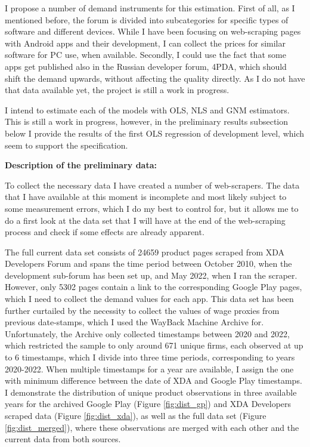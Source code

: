 \documentclass[13pt]{article}
\numberwithin{figure}{section}
\numberwithin{table}{section}
\theoremstyle{indented}
\numberwithin{equation}{section} %
\begin{document}
I propose a number of demand instruments for this estimation. First of all, as I mentioned before, the forum is divided into subcategories for specific types of software and different devices. While I have been focusing on web-scraping pages with Android apps and their development, I can collect the prices for similar software for PC use, when available. Secondly, I could use the fact that some apps get published also in the Russian developer forum, 4PDA, which should shift the demand upwards, without affecting the quality directly. As I do not have that data available yet, the project is still a work in progress.

I intend to estimate each of the models with OLS, NLS and GNM estimators. This is still a work in progress, however, in the preliminary results subsection below I provide the results of the first OLS regression of development level, which seem to support the specification.



 
\textbf{Description of the preliminary data:} 

To collect the necessary data I have created a number of web-scrapers. The data that I have available at this moment is incomplete and most likely subject to some measurement errors, which I do my best to control for, but it allows me to do a first look at the data set that I will have at the end of the web-scraping process and check if some effects are already apparent.

The full current data set consists of 24659 product pages scraped from XDA Developers Forum and spans the time period between October 2010, when the development sub-forum has been set up, and May 2022, when I ran the scraper. However, only 5302 pages contain a link to the corresponding Google Play pages, which I need to collect the demand values for each app. This data set has been further curtailed by the necessity to collect the values of wage  proxies from previous date-stamps, which I used the WayBack Machine Archive for. Unfortunately, the Archive only collected timestamps between 2020 and 2022, which restricted the sample to only around 671 unique firms, each observed at up to 6 timestamps, which I divide into three time periods, corresponding to years 2020-2022. When multiple timestamps for a year are available, I assign the one with minimum difference between the date of XDA and Google Play timestamps. I demonstrate the distribution of unique product observations in three available years for the archived Google Play (Figure \ref{fig:dist_gp}) and XDA Developers scraped data (Figure \ref{fig:dist_xda}), as well as the full data set (Figure \ref{fig:dist_merged}), where these observations are merged with each other and the current data from both sources. 
\end{document}
